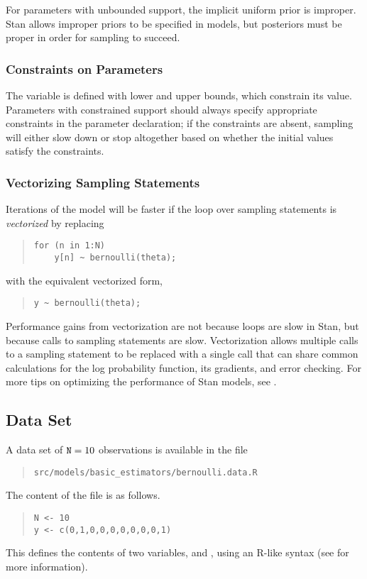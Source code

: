 For parameters with unbounded support, the implicit uniform prior is
improper.  Stan allows improper priors to be specified in models, but
posteriors must be proper in order for sampling to succeed.


\subsubsection{Constraints on Parameters}

The variable  is defined with lower and upper bounds,
which constrain its value.  Parameters with constrained support should
always specify appropriate constraints in the parameter declaration;
if the constraints are absent, sampling will either slow down or stop
altogether based on whether the initial values satisfy the constraints.

\subsubsection{Vectorizing Sampling Statements}

Iterations of the model will be faster if the loop over sampling
statements is \textit{vectorized} by replacing
%
\begin{quote}
\begin{Verbatim}[fontsize=\small]
  for (n in 1:N) 
    y[n] ~ bernoulli(theta);
\end{Verbatim}
\end{quote}
%
with the equivalent vectorized form,
%
\begin{quote}
\begin{Verbatim}[fontsize=\small]
  y ~ bernoulli(theta);
\end{Verbatim}
\end{quote}
%
Performance gains from vectorization are not because loops are slow in
Stan, but because calls to sampling statements are slow.
Vectorization allows multiple calls to a sampling statement to be
replaced with a single call that can share common calculations for the
log probability function, its gradients, and error checking.  For more
tips on optimizing the performance of Stan models, see
.


\subsection{Data Set}

A data set of $\mbox{{\tt N}}=10$ observations is available in the file
%
\begin{quote}
\nolinkurl{src/models/basic_estimators/bernoulli.data.R}
\end{quote}
%
The content of the file is as follows.
%
\begin{quote}
\begin{Verbatim}[fontsize=\small]
N <- 10
y <- c(0,1,0,0,0,0,0,0,0,1)
\end{Verbatim}
\end{quote}
%
This defines the contents of two variables,  and ,
using an R-like syntax (see  for more information).



